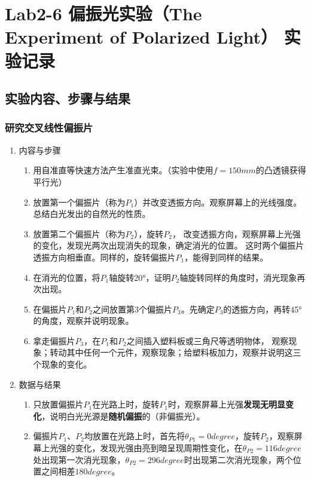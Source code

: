 \documentclass[dvipsnames, svgnames,a4paper,11pt]{article}
\begin{document}
	\section{Lab2-6 偏振光实验（The Experiment of Polarized Light）  \quad\heiti 实验记录}
	
	\subsection{实验内容、步骤与结果}
	
	\subsubsection{研究交叉线性偏振片}
	\begin{enumerate}
		\item 内容与步骤
		
		\begin{enumerate}
			\item 用自准直等快速方法产生准直光束。（实验中使用$f=150mm$的凸透镜获得平行光）
			\item 放置第一个偏振片（称为$P_1$）并改变透振方向。观察屏幕上的光线强度。 总结白光发出的自然光的性质。
			
			\item 放置第二个偏振片（称为$P_2$），旋转$P_2$， 改变透振方向，观察屏幕上光强的变化，发现光两次出现消失的现象，确定消光的位置。 这时两个偏振片透振方向相垂直。同样的，旋转偏振片$P_1$，能得到同样的结果。
			\item 在消光的位置，将$P_1$轴旋转20°，证明$P_2$轴旋转同样的角度时，消光现象再次出现。
			\item 在偏振片$P_1$和$P_2$之间放置第3个偏振片$P_3$。先确定$P_3$的透振方向，再转45°的角度，观察并说明现象。
			\item 拿走偏振片$P_3$，在$P_1$和$P_2$之间插入塑料板或三角尺等透明物体， 观察现象；转动其中任何一个元件，观察现象；给塑料板加力，观察并说明这三个现象的变化。
			
		\end{enumerate}
		
		\item 数据与结果
		
		\begin{enumerate}
			\item 只放置偏振片$P_1$在光路上时，旋转$P_1$时，观察屏幕上光强\textbf{发现无明显变化}，说明白光光源是\textbf{随机偏振}的（非偏振光）。
			
			\item 偏振片$P_1$、$P_2$均放置在光路上时，首先将$\theta_{P1}=0 degree$，旋转$P_2$，观察屏幕上光强的变化，发现光强由亮到暗呈现周期性变化，在$\theta_{P2}=116degree$处出现第一次消光现象，$\theta_{P2}=296degree$时出现第二次消光现象，两个位置之间相差$180degree$。					
			

\end{enumerate}
\end{enumerate}
\end{document}
